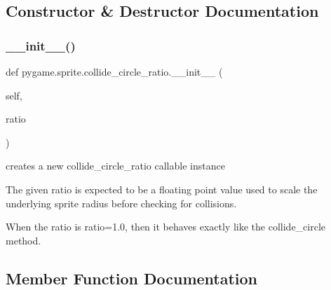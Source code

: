 \subsection{Constructor \& Destructor Documentation}
\mbox{\label{classpygame_1_1sprite_1_1collide__circle__ratio_a9e8814fc9fa6f041f00a6364bfd8a1b3}} 
\subsubsection{\texorpdfstring{\+\_\+\+\_\+init\+\_\+\+\_\+()}{\_\_init\_\_()}}
{\footnotesize\ttfamily def pygame.\+sprite.\+collide\+\_\+circle\+\_\+ratio.\+\_\+\+\_\+init\+\_\+\+\_\+ (\begin{DoxyParamCaption}\item[{}]{self,  }\item[{}]{ratio }\end{DoxyParamCaption})}

\begin{DoxyVerb}creates a new collide_circle_ratio callable instance

The given ratio is expected to be a floating point value used to scale
the underlying sprite radius before checking for collisions.

When the ratio is ratio=1.0, then it behaves exactly like the 
collide_circle method.\end{DoxyVerb}
 

\subsection{Member Function Documentation}
\mbox{\label{classpygame_1_1sprite_1_1collide__circle__ratio_a31932a1fe8275e90f63ccf5c195416f3}} 
